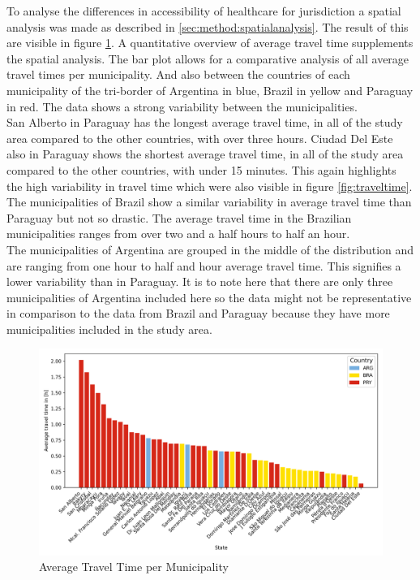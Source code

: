 \documentclass[11pt, a4paper]{report}
\begin{document}
To analyse the differences in accessibility of healthcare for jurisdiction a spatial analysis was made as described in \ref{sec:method:spatialanalysis}. The result of this are visible in figure \ref{fig:traveltimestatesplot}. A quantitative overview of average travel time supplements the spatial analysis. The bar plot allows for a comparative analysis of all average travel times per municipality. And also between the countries of each municipality of the tri-border of Argentina in blue, Brazil in yellow and Paraguay in red. The data shows a strong variability between the municipalities.  \\
%
San Alberto in Paraguay has the longest average travel time, in all of the study area compared to the other countries, with over three hours. Ciudad Del Este also in Paraguay shows the shortest average travel time, in all of the study area compared to the other countries, with under 15 minutes. This again highlights the high variability in travel time which were also visible in figure \ref{fig:traveltime}.  \\
%
The municipalities of Brazil show a similar variability in average travel time than Paraguay but not so drastic. The average travel time in the Brazilian municipalities ranges from over two and a half hours to half an hour.\\
%
The municipalities of Argentina are grouped in the middle of the distribution and are ranging from one hour to half and hour average travel time. This signifies a lower variability than in Paraguay. It is to note here that there are only three municipalities of Argentina included here so the data might not be representative in comparison to the data from Brazil and Paraguay because they have more municipalities included in the study area. 

\begin{figure}[H]
  \centering
  \includegraphics[width=0.9\linewidth]{figures/states.png}
  \caption{Average Travel Time per Municipality}
  \label{fig:traveltimestatesplot}
\end{figure}
\end{document}
